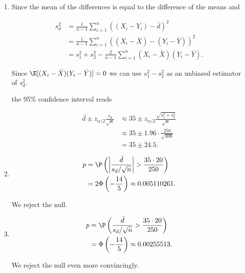 \begin{solution}

\phantom{}

\begin{enumerate}[label = (\alph*)]
    \item Since the mean of the differences is equal to the difference of the means and

    \begin{align*}
        s_d^2 &= \frac{1}{n-1}\sum_{i=1}^n ((X_i - Y_i) - \bar{d})^2 \\
        &= \frac{1}{n-1}\sum_{i=1}^n ((X_i - \bar{X}) -  (Y_i - \bar{Y}))^2 \\
        &= s_1^2 + s_2^2 - \frac{2}{n-1}\sum_{i=1}^n(X_i - \bar{X})(Y_i - \bar{Y}).
    \end{align*}

    Since $\E[(X_i - \bar{X})(Y_i - \bar{Y})] = 0$ we can use $s_1^2 - s_2^2$ as an unbiased estimator of $s_d^2$.

    the 95\% confidence interval reads
    
    \begin{align*}
        \bar{d} \pm z_{\alpha/2}\frac{s_d}{\sqrt{n}}
        &\approx 35 \pm z_{\alpha/2}\frac{\sqrt{s_1^2 + s_2^2}}{\sqrt{n}} \\
        &\approx 35 \pm 1.96 \cdot\frac{250}{\sqrt{400}} \\
        &= 35 \pm 24.5.
    \end{align*}

    \item 

    \begin{align*}
        p &= \P\left( \left| \frac{\bar{d}}{s_d/\sqrt{n}} \right| > \frac{35 \cdot 20}{250} \right) \\
        &= 2\Phi\left(-\frac{14}{5}\right) \approx 0.005110261.
    \end{align*}

    We reject the null.

    \item 

    \begin{align*}
        p &= \P\left( \frac{\bar{d}}{s_d/\sqrt{n}} > \frac{35 \cdot 20}{250} \right) \\
        &= \Phi\left(-\frac{14}{5}\right) \approx 0.00255513.
    \end{align*}

    We reject the null even more convincingly.


\end{enumerate}
\end{solution}
